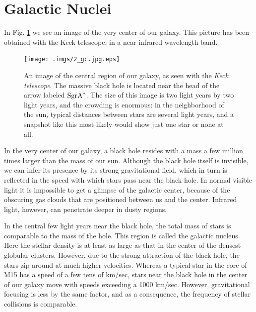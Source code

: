 \documentclass{book}
\begin{document}
\section{  Galactic Nuclei}
\label{sect:7}

In Fig. \ref{gc} we see an image of the very center of our galaxy.
This picture has been obtained with the Keck telescope,
in a near infrared wavelength band.


 
\begin{figure}
\begin{minipage}{\columnwidth}
\begin{center}
\renewcommand{\thefootnote}{\alph{footnote}}
    \texttt{[image: .imgs/2\_gc.jpg.eps]}
\caption{An image of the central region of our galaxy, as seen with the
 {\it Keck telescope\protect \footnotemark[1]}.
The massive black hole is located near the head of the arrow labeled
 ${\rm Sgr A}^*$.  The size of this image is two light
years by two light years, and the crowding is enormous: in the
neighborhood of the sun, typical distances between stars are several
light years, and a snapshot like this most likely would show just one
star or none at all.
}

\label{gc}
\end{center}
\end{minipage}
\end{figure}



In the very center of our galaxy, a black hole resides with a mass a
few million times larger than the mass of our sun.  Although the black
hole itself is invisible, we can infer its presence by its strong
gravitational field, which in turn is reflected in the speed with
which stars pass near the black hole.  In normal visible light it is
impossible to get a glimpse of the galactic center, because of the
obscuring gas clouds that are positioned between us and the center.
Infrared light, however, can penetrate deeper in dusty regions.

In the central few light years near the black hole, the total mass of
stars is comparable to the mass of the hole.  This region is
called the galactic nucleus.  Here the stellar density is at least as
large as that in the center of the densest globular clusters.  However,
due to the strong attraction of the black hole, the stars zip around at
much higher velocities.  Whereas a typical star in the core of M15 has
a speed of a few tens of km/sec, stars near the black hole in the
center of our galaxy move with speeds exceeding a 1000 km/sec.
However, gravitational focusing is less by the same factor, and as a
consequence, the frequency of stellar collisions is comparable.
\end{document}
